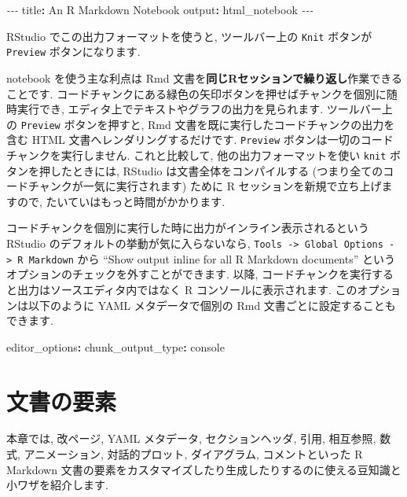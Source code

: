 \documentclass[
  11pt,
  lualatex,
  ja=standard]{bxjsreport}
\newenvironment{Shaded}{\begin{snugshade}}{\end{snugshade}}
\newcommand{\AttributeTok}[1]{\textcolor[rgb]{0.77,0.63,0.00}{#1}}
\newcommand{\FunctionTok}[1]{\textcolor[rgb]{0.00,0.00,0.00}{#1}}
\newcommand{\KeywordTok}[1]{\textcolor[rgb]{0.13,0.29,0.53}{\textbf{#1}}}
\newcommand{\PreprocessorTok}[1]{\textcolor[rgb]{0.56,0.35,0.01}{\textit{#1}}}
\begin{document}
\begin{Shaded}
\begin{Highlighting}[]
\PreprocessorTok{{-}{-}{-}}
\FunctionTok{title}\KeywordTok{:}\AttributeTok{ An R Markdown Notebook}
\FunctionTok{output}\KeywordTok{:}\AttributeTok{ html\_notebook}
\PreprocessorTok{{-}{-}{-}}
\end{Highlighting}
\end{Shaded}

RStudio でこの出力フォーマットを使うと, ツールバー上の \texttt{Knit} ボタンが \texttt{Preview} ボタンになります.

notebook を使う主な利点は Rmd 文書を\textbf{同じRセッションで繰り返し}作業できることです. コードチャンクにある緑色の矢印ボタンを押せばチャンクを個別に随時実行でき, エディタ上でテキストやグラフの出力を見られます. ツールバー上の \texttt{Preview} ボタンを押すと, Rmd 文書を既に実行したコードチャンクの出力を含む HTML 文書へレンダリングするだけです. \texttt{Preview} ボタンは一切のコードチャンクを実行しません. これと比較して, 他の出力フォーマットを使い \texttt{knit} ボタンを押したときには, RStudio は文書全体をコンパイルする (つまり全てのコードチャンクが一気に実行されます) ために R セッションを新規で立ち上げますので, たいていはもっと時間がかかります.

コードチャンクを個別に実行した時に出力がインライン表示されるという RStudio のデフォルトの挙動が気に入らないなら, \texttt{Tools -\textgreater{}\ Global\ Options\ -\textgreater{}\ R\ Markdown} から ``Show output inline for all R Markdown documents'' というオプションのチェックを外すことができます. 以降, コードチャンクを実行すると出力はソースエディタ内ではなく R コンソールに表示されます. このオプションは以下のように YAML メタデータで個別の Rmd 文書ごとに設定することもできます.

\begin{Shaded}
\begin{Highlighting}[]
\FunctionTok{editor\_options}\KeywordTok{:}
\AttributeTok{  }\FunctionTok{chunk\_output\_type}\KeywordTok{:}\AttributeTok{ console}
\end{Highlighting}
\end{Shaded}

\hypertarget{document-elements}{%
\chapter{文書の要素}\label{document-elements}}

本章では, 改ページ, YAML メタデータ, セクションヘッダ, 引用, 相互参照, 数式, アニメーション, 対話的プロット, ダイアグラム, コメントといった R Markdown 文書の要素をカスタマイズしたり生成したりするのに使える豆知識と小ワザを紹介します.
\end{document}
